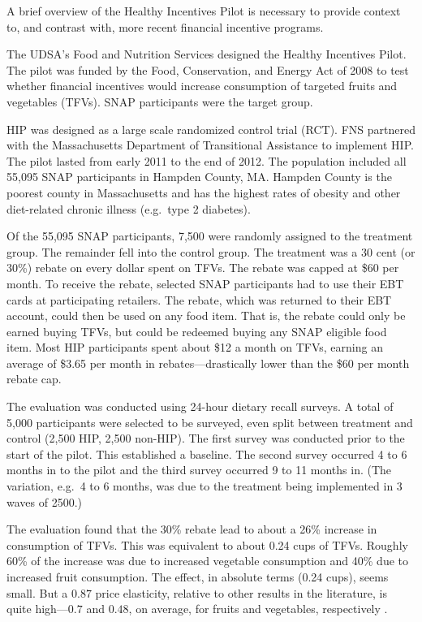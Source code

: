 \documentclass[12pt,letterpaperpaper,]{book}
\begin{document}
A brief overview of the Healthy Incentives Pilot is necessary to provide
context to, and contrast with, more recent financial incentive programs.

The UDSA's Food and Nutrition Services designed the Healthy Incentives
Pilot. The pilot was funded by the Food, Conservation, and Energy Act of
2008 to test whether financial incentives would increase consumption of
targeted fruits and vegetables (TFVs). SNAP participants were the target
group.

HIP was designed as a large scale randomized control trial (RCT). FNS
partnered with the Massachusetts Department of Transitional Assistance
to implement HIP. The pilot lasted from early 2011 to the end of 2012.
The population included all 55,095 SNAP participants in Hampden County,
MA. Hampden County is the poorest county in Massachusetts and has the
highest rates of obesity and other diet-related chronic illness
(e.g.~type 2 diabetes).

Of the 55,095 SNAP participants, 7,500 were randomly assigned to the
treatment group. The remainder fell into the control group. The
treatment was a 30 cent (or 30\%) rebate on every dollar spent on TFVs.
The rebate was capped at \$60 per month. To receive the rebate, selected
SNAP participants had to use their EBT cards at participating retailers.
The rebate, which was returned to their EBT account, could then be used
on any food item. That is, the rebate could only be earned buying TFVs,
but could be redeemed buying any SNAP eligible food item. Most HIP
participants spent about \$12 a month on TFVs, earning an average of
\$3.65 per month in rebates---drastically lower than the \$60 per month
rebate cap.

The evaluation was conducted using 24-hour dietary recall surveys. A
total of 5,000 participants were selected to be surveyed, even split
between treatment and control (2,500 HIP, 2,500 non-HIP). The first
survey was conducted prior to the start of the pilot. This established a
baseline. The second survey occurred 4 to 6 months in to the pilot and
the third survey occurred 9 to 11 months in. (The variation, e.g.~4 to 6
months, was due to the treatment being implemented in 3 waves of 2500.)

The evaluation found that the 30\% rebate lead to about a 26\% increase
in consumption of TFVs. This was equivalent to about 0.24 cups of TFVs.
Roughly 60\% of the increase was due to increased vegetable consumption
and 40\% due to increased fruit consumption. The effect, in absolute
terms (0.24 cups), seems small. But a \(0.87\) price elasticity,
relative to other results in the literature, is quite high---\(0.7\) and
\(0.48\), on average, for fruits and vegetables, respectively
\citep{andreyeva_impact_2010}.
\end{document}
